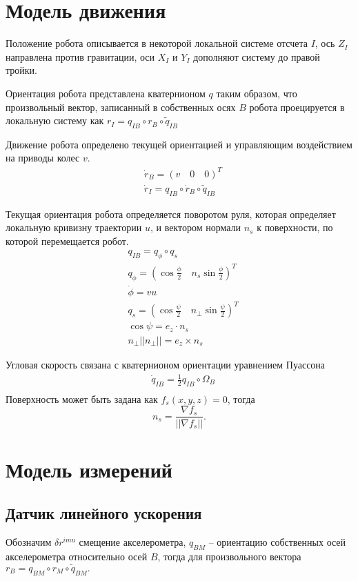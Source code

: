 \documentclass[a4paper,12pt]{article}
\begin{document}
\section{Модель движения}

Положение робота описывается в некоторой локальной системе отсчета $I$, ось $Z_I$ направлена против гравитации, оси $X_I$ и $Y_I$ дополняют систему до правой тройки.

Ориентация робота представлена кватернионом $q$ таким образом, что произвольный вектор, записанный в собственных осях $B$ робота проецируется в локальную систему как
$r_I = q_{IB} \circ r_B \circ \tilde{q}_{IB}$

Движение робота определено текущей ориентацией и управляющим воздействием на приводы колес $v$.
\begin{align*} 
&\dot{r}_B = (v \quad 0 \quad 0)^T \\
&\dot{r}_I = q_{IB} \circ \dot{r}_B \circ \tilde{q}_{IB}
\end{align*}

Текущая ориентация робота определяется поворотом руля, которая определяет локальную кривизну траектории $u$, и вектором нормали $n_s$ к поверхности, по которой перемещается робот.
\begin{align*} 
&q_{IB} = q_{\phi} \circ q_{s} \\
&q_{\phi} = (\cos{\frac{\phi}{2}} \quad n_{s}\sin{\frac{\phi}{2}})^T \\
&\dot{\phi} = vu \\
&q_{s} = (\cos{\frac{\psi}{2}} \quad n_{\perp}\sin{\frac{\psi}{2}})^T \\
&\cos{\psi} = e_z \cdot n_s \\
& n_{\perp} ||n_{\perp}|| = e_z \times n_s 
\end{align*}

Угловая скорость связана с кватернионом ориентации уравнением Пуассона
\begin{align*} 
&\dot{q}_{IB} = \frac{1}{2} q_{IB} \circ \Omega_{B} \\
\end{align*}
Поверхность может быть задана как $f_s(x,y,z) = 0$,
тогда 
$$n_s = \frac{\nabla f_s}{||\nabla f_s||}.$$


\section{Модель измерений}
	
\subsection{Датчик линейного ускорения}
Обозначим $\delta r^{imu}$ смещение акселерометра,  $q_{BM}$ -- ориентацию собственных осей акселерометра относительно осей $B$, тогда для произвольного вектора
$r_B = q_{BM} \circ r_M \circ \tilde{q}_{BM}.$
\end{document}
